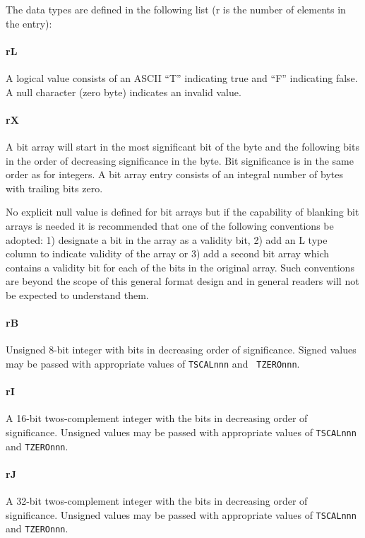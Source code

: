 The data types are defined in the following list (r is the
number of elements in the entry):

\paragraph{rL} A logical value
 consists of an ASCII ``T'' indicating true 
and ``F'' indicating false.  A null character (zero byte)
indicates an invalid value.

\paragraph{rX} A bit array will start 
in the most significant bit of the byte
and the following bits in the order
of decreasing significance in the
byte.  Bit significance is in the same order as for integers.  A bit
array entry consists of an integral number of bytes with trailing bits
zero.

   No explicit null value 
is defined for bit arrays but if the
capability of blanking bit arrays is needed it is recommended that one
of the following conventions be adopted: 1) designate a bit
in the array as a validity bit, 2) add an L type column to indicate
validity of the array or 3) add a second bit array which contains a
validity bit for each of the bits in the original array.  Such
conventions are beyond the scope of this general format design and
in general readers will not be expected to understand them.

\paragraph{rB}  Unsigned 8-bit integer with bits in
decreasing order of significance.  
Signed values may be passed with
appropriate values of {\tt TSCALnnn} and {\tt
TZEROnnn}.

\paragraph{rI} A 16-bit twos-complement
integer with the bits
in decreasing order of
significance.  Unsigned values may be passed with
appropriate values of {\tt TSCALnnn} and {\tt TZEROnnn}.

\paragraph{rJ} A 32-bit twos-complement
integer with the bits
in decreasing order of significance.  Unsigned values may be passed with
appropriate values of {\tt TSCALnnn} and {\tt TZEROnnn}.


